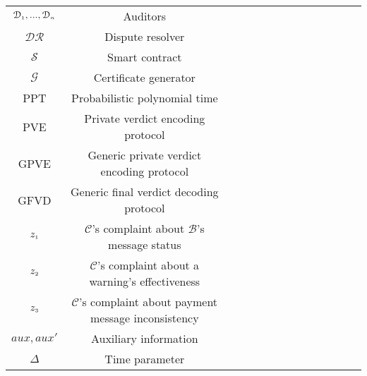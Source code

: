 \begin{table}[!htbp]
\begin{scriptsize}
\begin{center}
{{\begin{tabular}{|c|c|c|c|c|c|c|c|c|c|c|c|c|c|}
%  
\cellcolor{white!20}\scriptsize$\mathcal{D}_{\scriptscriptstyle 1},... , \mathcal{D}_{\scriptscriptstyle n}$ &\cellcolor{white!20}\scriptsize Auditors  \\  
%
\cellcolor{gray!20}\scriptsize$\mathcal{DR}$ &\cellcolor{gray!20}\scriptsize Dispute resolver  \\  
%
\cellcolor{white!20}\scriptsize$\mathcal{S}$ &\cellcolor{white!20}\scriptsize Smart contract  \\  
%
\cellcolor{gray!20}\scriptsize$\mathcal{G}$ &\cellcolor{gray!20}\scriptsize Certificate generator  \\  
%
%
\cellcolor{white!20}\scriptsize PPT&\cellcolor{white!20}\scriptsize  Probabilistic polynomial time \\    
%
\cellcolor{gray!20}\scriptsize{PVE} &\cellcolor{gray!20}\scriptsize  Private verdict encoding  protocol\\ 
%
%
\cellcolor{white!20}\scriptsize{GPVE} &\cellcolor{white!20}\scriptsize  Generic private verdict encoding protocol\\ 
%
\cellcolor{gray!20}\scriptsize{GFVD} &\cellcolor{gray!20}\scriptsize  Generic final verdict decoding protocol\\ 
%
\cellcolor{white!20}\scriptsize$z_{\scriptscriptstyle 1}$ &\cellcolor{white!20}\scriptsize  $\mathcal{C}$'s complaint about $\mathcal{B}$'s message status\\ 
% 
\cellcolor{gray!20}\scriptsize$z_{\scriptscriptstyle 2}$ &\cellcolor{gray!20}\scriptsize  $\mathcal{C}$'s complaint about a warning's effectiveness\\
%
\cellcolor{white!20}\scriptsize$z_{\scriptscriptstyle 3}$ &\cellcolor{white!20}\scriptsize  $\mathcal{C}$'s complaint about payment message  inconsistency\\ 
%
\cellcolor{gray!20}\scriptsize$aux, aux'$ &\cellcolor{gray!20}\scriptsize  Auxiliary information\\ 
%
%
\cellcolor{white!20}\scriptsize$\Delta$ &\cellcolor{white!20}\scriptsize  Time parameter \\ 


\end{tabular}}}
\end{center}
\end{scriptsize}
\end{table}
